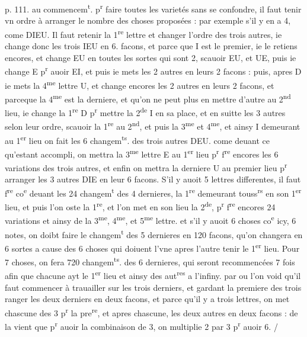 \documentclass[11pt,a4paper]{article}
\begin{document}
p. 111. au commencem\textsuperscript{t}.
p\textsuperscript{r} faire toutes les varietés sans se confondre, il faut tenir vn ordre à arranger le nombre des choses proposées : par exemple s'il y en a 4, come DIEU. Il faut retenir la 1\textsuperscript{re} lettre et changer l'ordre des trois autres, ie change donc les trois IEU en 6. facons, et parce que I est le premier, ie le retiens encores, et change EU en toutes les sortes qui sont 2, scauoir EU, et UE, puis ie change E p\textsuperscript{r} auoir EI, et puis ie mets les 2 autres en leurs 2 facons : puis, apres D ie mets la 4\textsuperscript{me} lettre U, et change encores les 2 autres en leurs 2 facons, et parceque la 4\textsuperscript{me} est la derniere, et qu'on ne peut plus en mettre d'autre au 2\textsuperscript{nd} lieu, ie change la 1\textsuperscript{re} D p\textsuperscript{r} mettre la 2\textsuperscript{de} I en sa place, et en suitte les 3 autres selon leur ordre, scauoir la 1\textsuperscript{re} au 2\textsuperscript{nd}, et puis la 3\textsuperscript{me} et 4\textsuperscript{me}, et ainsy I demeurant au 1\textsuperscript{er} lieu on fait les 6 changem\textsuperscript{ts}. des trois autres DEU. come deuant ce qu'estant accompli, on mettra la 3\textsuperscript{me} lettre E au 1\textsuperscript{er} lieu p\textsuperscript{r} f\textsuperscript{re} encores les 6 variations des trois autres, et enfin on mettra la derniere U au premier lieu p\textsuperscript{r} arranger les 3 autres DIE en leur 6 facons.
S'il y auoit 5 lettres differentes, il faut f\textsuperscript{re} co\textsuperscript{e} deuant les 24 changem\textsuperscript{t} des 4 dernieres, la 1\textsuperscript{re} demeurant touss\textsuperscript{rs} en son 1\textsuperscript{er} lieu, et puis l'on oste la 1\textsuperscript{re}, et l'on met en son lieu la 2\textsuperscript{de}, p\textsuperscript{r} f\textsuperscript{re} encores 24 variations et ainsy de la 3\textsuperscript{me}, 4\textsuperscript{me}, et 5\textsuperscript{me} lettre.
et s'il y auoit 6 choses co\textsuperscript{e} icy, 6 notes, on doibt faire le changem\textsuperscript{t} des 5 dernieres en 120 facons, qu'on changera en 6 sortes a cause des 6 choses qui doiuent l'vne apres l'autre tenir le 1\textsuperscript{er} lieu.
Pour 7 choses, on fera 720 changem\textsuperscript{ts}. des 6 dernieres, qui seront recommencées 7 fois afin que chacune ayt le 1\textsuperscript{er} lieu et ainsy des aut\textsuperscript{res} a l'infiny.
par ou l'on void qu'il faut commencer à trauailler sur les trois derniers, et gardant la premiere des trois ranger les deux derniers en deux facons, et parce qu'il y a trois lettres, on met chascune des 3 p\textsuperscript{r} la pre\textsuperscript{re}, et apres chascune, les deux autres en deux facons : de la vient que p\textsuperscript{r} auoir la combinaison de 3, on multiplie 2 par 3 p\textsuperscript{r} auoir 6. /
\end{document}
